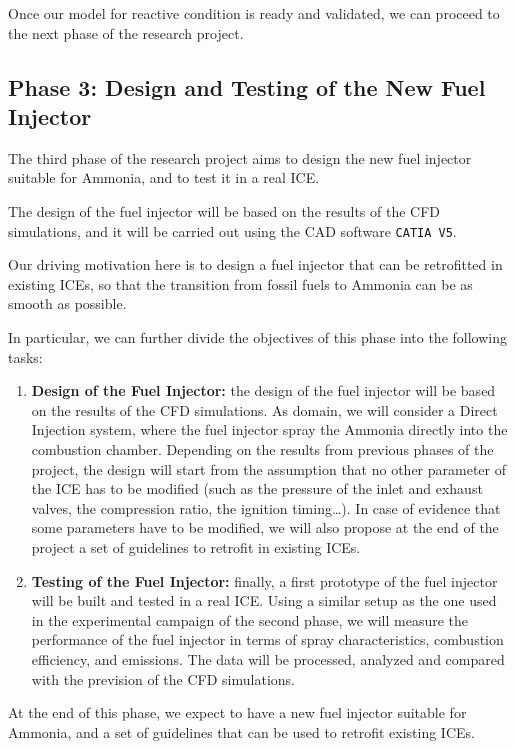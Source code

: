 Once our model for reactive condition is ready and validated, we can proceed to the next phase of the research project.

\subsection{Phase 3: Design and Testing of the New Fuel Injector}

The third phase of the research project aims to design the new fuel injector suitable for Ammonia, and to test it in a real ICE.

The design of the fuel injector will be based on the results of the CFD simulations, and it will be carried out using the CAD software \texttt{CATIA V5}.

Our driving motivation here is to design a fuel injector that can be retrofitted in existing ICEs, so that the transition from fossil fuels to Ammonia can be as smooth as possible.

In particular, we can further divide the objectives of this phase into the following tasks:

\begin{enumerate}
    \item \textbf{Design of the Fuel Injector:} the design of the fuel injector will be based on the results of the CFD simulations. As domain, we will consider a Direct Injection system, where the fuel injector spray the Ammonia directly into the combustion chamber. Depending on the results from previous phases of the project, the design will start from the assumption that no other parameter of the ICE has to be modified (such as the pressure of the inlet and exhaust valves, the compression ratio, the ignition timing\dots). In case of evidence that some parameters have to be modified, we will also propose at the end of the project a set of guidelines to retrofit in existing ICEs.
    \item \textbf{Testing of the Fuel Injector:} finally, a first prototype of the fuel injector will be built and tested in a real ICE. Using a similar setup as the one used in the experimental campaign of the second phase, we will measure the performance of the fuel injector in terms of spray characteristics, combustion efficiency, and emissions. The data will be processed, analyzed and compared with the prevision of the CFD simulations.
\end{enumerate}

At the end of this phase, we expect to have a new fuel injector suitable for Ammonia, and a set of guidelines that can be used to retrofit existing ICEs.
